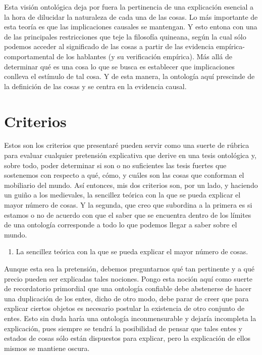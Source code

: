 \documentclass[]{book}
\begin{document}
Esta visión ontológica deja por fuera la pertinencia de una explicación
esencial a la hora de dilucidar la naturaleza de cada una de las cosas.
Lo más importante de esta teoría es que las implicaciones causales se
mantengan. Y esto entona con una de las principales restricciones que
teje la filosofía quineana, según la cual sólo podemos acceder al
significado de las cosas a partir de las evidencia
empírica-comportamental de los hablantes (y su verificación empírica).
Más allá de determinar qué es una cosa lo que se busca es establecer que
implicaciones conlleva el estímulo de tal cosa. Y de esta manera, la
ontología aquí prescinde de la definición de las cosas y se centra en la
evidencia causal.

\section*{Criterios}

Estos son los criterios que presentaré pueden servir como una suerte de
rúbrica para evaluar cualquier pretensión explicativa que derive en una
tesis ontológica y, sobre todo, poder determinar si son o no suficientes
las tesis fuertes que sostenemos con respecto a qué, cómo, y cuáles son
las cosas que conforman el mobiliario del mundo. Así entonces, mis dos
criterios son, por un lado, y haciendo un guiño a los medievales, la
sencillez teórica con la que se pueda explicar el mayor número de cosas.
Y la segunda, que creo que subordina a la primera es si estamos o no de
acuerdo con que el saber que se encuentra dentro de los límites de una
ontología corresponde a todo lo que podemos llegar a saber sobre el
mundo.

\begin{enumerate}
\def\labelenumi{\arabic{enumi}.}
\item
  La sencillez teórica con la que se pueda explicar el mayor número de
  cosas.
\end{enumerate}

Aunque esta sea la pretensión, debemos preguntarnos qué tan pertinente y
a qué precio pueden ser explicadas tales nociones. Pongo esta noción
aquí como suerte de recordatorio primordial que una ontología confiable
debe abstenerse de hacer una duplicación de los entes, dicho de otro
modo, debe parar de creer que para explicar ciertos objetos es necesario
postular la existencia de otro conjunto de entes. Esto sin duda haría
una ontología inconmensurable y dejaría incompleta la explicación, pues
siempre se tendrá la posibilidad de pensar que tales entes y estados de
cosas sólo están dispuestos para explicar, pero la explicación de ellos
mismos se mantiene oscura.
\end{document}
